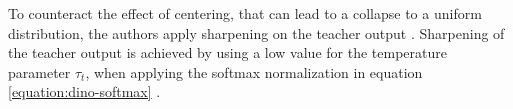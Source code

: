 To counteract the effect of centering, that can lead to a collapse to a uniform distribution, the authors apply sharpening on the teacher output \citep{Caron2021}.
Sharpening of the teacher output is achieved by using a low value for the temperature parameter $\tau_t$, when applying the softmax normalization in equation \ref{equation:dino-softmax} \citep{Caron2021}.
